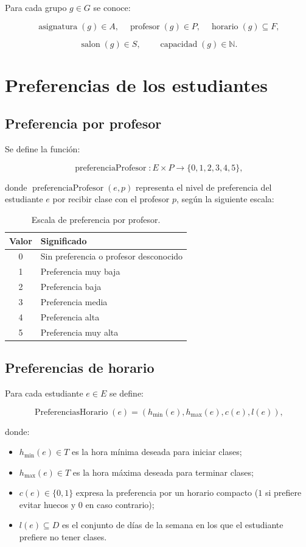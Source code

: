 \documentclass[11pt]{article}
\numberwithin{equation}{section}
\numberwithin{figure}{section}
\numberwithin{table}{section}
\theoremstyle{definition}
\begin{document}
Para cada grupo $g\in G$ se conoce:

\[
\operatorname{asignatura}(g)\in A,\quad
\operatorname{profesor}(g)\in P,\quad
\operatorname{horario}(g)\subseteq F,
\]

\[
\operatorname{salon}(g)\in S,\qquad
\operatorname{capacidad}(g)\in\mathbb{N}.
\]

\section{Preferencias de los estudiantes}

\subsection{Preferencia por profesor}

Se define la función:

\[
\operatorname{preferenciaProfesor}:E\times P
\rightarrow\{0,1,2,3,4,5\},
\]

donde $\operatorname{preferenciaProfesor}(e,p)$ representa el nivel de
preferencia del estudiante $e$ por recibir clase con el profesor $p$, según la
siguiente escala:

\begin{table}[H]
\centering
\caption{Escala de preferencia por profesor.}
\begin{tabular}{cl}
\toprule
\textbf{Valor} & \textbf{Significado} \\
\midrule
0 & Sin preferencia o profesor desconocido \\
1 & Preferencia muy baja \\
2 & Preferencia baja \\
3 & Preferencia media \\
4 & Preferencia alta \\
5 & Preferencia muy alta \\
\bottomrule
\end{tabular}
\end{table}

\subsection{Preferencias de horario}

Para cada estudiante $e\in E$ se define:

\[
\operatorname{PreferenciasHorario}(e)=
\left(h_{\min}(e),h_{\max}(e),c(e),l(e)\right),
\]

donde:

\begin{itemize}
  \item $h_{\min}(e)\in T$ es la hora mínima deseada para iniciar clases;
  \item $h_{\max}(e)\in T$ es la hora máxima deseada para terminar clases;
  \item $c(e)\in\{0,1\}$ expresa la preferencia por un horario compacto
        ($1$ si prefiere evitar huecos y $0$ en caso contrario);
  \item $l(e)\subseteq D$ es el conjunto de días de la semana en
        los que el estudiante prefiere no tener clases.
\end{itemize}
\end{document}
